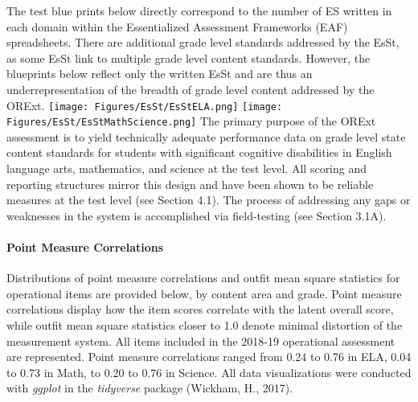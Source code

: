 \documentclass[]{article}
\let\oldparagraph\paragraph
\renewcommand{\paragraph}[1]{\oldparagraph{#1}\mbox{}}
\begin{document}
The test blue prints below directly correspond to the number of ES
written in each domain within the Essentialized Assessment Frameworks
(EAF) spreadsheets. There are additional grade level standards addressed
by the EsSt, as some EsSt link to multiple grade level content
standards. However, the blueprints below reflect only the written EsSt
and are thus an underrepresentation of the breadth of grade level
content addressed by the ORExt.\FloatBarrier
\texttt{[image: Figures/EsSt/EsStELA.png]} \FloatBarrier
\texttt{[image: Figures/EsSt/EsStMathScience.png]} The primary purpose
of the ORExt assessment is to yield technically adequate performance
data on grade level state content standards for students with
significant cognitive disabilities in English language arts,
mathematics, and science at the test level. All scoring and reporting
structures mirror this design and have been shown to be reliable
measures at the test level (see Section 4.1). The process of addressing
any gaps or weaknesses in the system is accomplished via field-testing
(see Section 3.1A).

\hypertarget{point-measure-correlations}{%
\paragraph{Point Measure
Correlations}\label{point-measure-correlations}}

Distributions of point measure correlations and outfit mean square
statistics for operational items are provided below, by content area and
grade. Point measure correlations display how the item scores correlate
with the latent overall score, while outfit mean square statistics
closer to 1.0 denote minimal distortion of the measurement system. All
items included in the 2018-19 operational assessment are represented.
Point measure correlations ranged from 0.24 to 0.76 in ELA, 0.04 to 0.73
in Math, to 0.20 to 0.76 in Science. All data visualizations were
conducted with \emph{ggplot} in the \emph{tidyverse} package (Wickham,
H., 2017).
\end{document}
